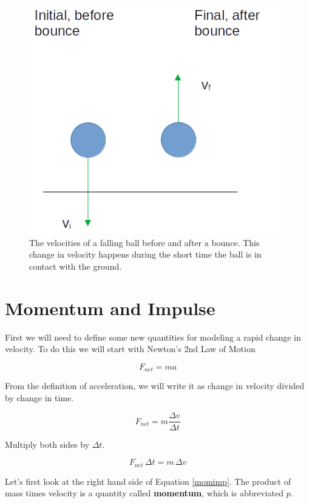 \documentclass[12pt]{book}
\begin{document}
\begin{figure}[H]
\centering
\includegraphics[scale=0.4]{bounce.png}
\caption{The velocities of a falling ball before and after a bounce. This change in velocity happens during the short time the ball is in contact with the ground.}
\label{bounceground}
\end{figure}

\section{Momentum and Impulse}

First we will need to define some new quantities for modeling a rapid change in velocity. To do this we will start with Newton's 2nd Law of Motion

\begin{equation}
F_{net} = ma
\end{equation}

From the definition of acceleration, we will write it as change in velocity divided by change in time.

\begin{equation}
F_{net} = m \frac{\Delta v}{\Delta t}
\end{equation}

Multiply both sides by $\Delta t$.

\begin{equation}
F_{net} \, \Delta t = m \, \Delta v
\label{momimp}
\end{equation}

Let's first look at the right hand side of Equation \ref{momimp}. The product of mass times velocity is a quantity called \textbf{momentum}, which is abbreviated $p$.
\end{document}
